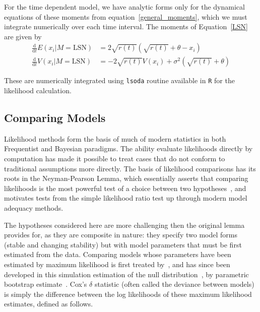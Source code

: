 \documentclass[authoryear,review,11pt]{elsarticle}
\newcommand{\ud}{\mathrm{d}}
\begin{document}
For the time dependent model, we have analytic forms only for the dynamical equations of these moments from equation~\eqref{general_moments}, which we must integrate numerically over each time interval.
The moments of Equation~\eqref{LSN} are given by
\begin{align}
\frac{\ud }{\ud t} E(x_i| M = \text{LSN})&=  2\sqrt{r(t)}(\sqrt{r(t)}+\theta - x_i) \\
\frac{\ud}{\ud t} V(x_i| M = \text{LSN}) &=  -2 \sqrt{r(t)} V(x_i) + \sigma^2 ( \sqrt{r(t)}+\theta )
\label{LSNsoln}
\end{align}

These are numerically integrated using \texttt{lsoda} routine available in \texttt{R} for the likelihood calculation.  

\subsection*{Comparing Models}
Likelihood methods form the basis of much of modern statistics
in both Frequentist and Bayesian paradigms.  
The ability evaluate likelihoods directly by computation has made it
possible to treat cases that do not conform to traditional assumptions more directly.
The basis of likelihood comparisons has its roots in the Neyman-Pearson Lemma, 
which essentially asserts that comparing likelihoods is the most powerful test
of a choice between two hypotheses~\citep{Neyman1933}, and motivates
tests from the simple likelihood ratio test up through modern model adequacy methods.

The hypotheses considered here are more challenging then the original lemma provides for, 
as they are composite in nature:
they specify two model forms (stable and changing stability)
but with model parameters that must be first estimated from the data.
Comparing models whose parameters have been estimated by maximum likelihood is first treated by~\citet{Cox1961, Cox1962},
and has since been developed in this simulation estimation of the null distribution~\citep{McLachlan1987}, by parametric bootstrap estimate~\citep{Efron1987}.  
Cox's $\delta$ statistic (often called the deviance between models) 
is simply the difference between the log likelihoods of these maximum likelihood estimates, defined as follows.
\end{document}
